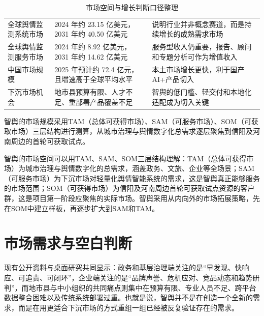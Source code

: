 \begin{table}[htbp]
	\centering
	\caption{市场空间与增长判断口径整理}
	\begin{tabularx}{\textwidth}{L{3.4cm}L{2.6cm}Y}
		\toprule
		 &                       &            \\
		\midrule
		全球舆情监测系统市场     & 2024 年约 23.15 亿美元，2031 年约 40.50 亿美元 & 说明行业并非概念赛道，而是持续增长的成熟需求市场   \\
		全球舆情监测服务市场     & 2024 年约 8.92 亿美元，2031 年约 14.62 亿美元  & 服务型收入仍重要，报告、顾问和专题分析可作为增值收入 \\
		中国市场规模         & 2025 年预计约 72.4 亿元，且增速高于全球平均水平       & 本土市场增长更快，利于国产 AI+产品切入      \\
		下沉市场机会         & 地市县预算有限、人才不足、重部署产品覆盖不足              & 智舆的低门槛、轻交付和本地化适配成为切入关键     \\
		\bottomrule
	\end{tabularx}
\end{table}


智舆的市场规模采用TAM（总体可获得市场）、SAM（可服务市场）、SOM（可获取市场）三层结构进行测算，从城市治理与舆情数字化总需求逐层聚焦到信阳及河南周边的首轮可获取试点。

智舆的市场空间可以用TAM、SAM、SOM三层结构理解：TAM（总体可获得市场）为城市治理与舆情数字化的总需求，涵盖政务、文旅、企业等全场景；SAM（可服务市场）为下沉市场对轻量化舆情智能系统的需求，这是智舆真正能够服务的市场范围；SOM（可获得市场）为信阳及河南周边首轮可获取试点资源的客户群，这是项目第一阶段应聚焦的实际市场。智舆采用从内向外的市场拓展策略，先在SOM中建立样板，再逐步扩大到SAM和TAM。

\section{市场需求与空白判断}

现有公开资料与桌面研究共同显示：政务和基层治理端关注的是“早发现、快响应、可追责、可闭环”，企业端关注的是“品牌声誉、危机应对、竞品动态和趋势研判”，而地市县与中小组织的共同痛点则集中在预算有限、专业人员不足、跨平台数据整合困难以及传统系统部署过重。也就是说，智舆并不是在创造一个全新的需求，而是在用更适合下沉市场的方式重组一组已经被反复验证存在的需求。

